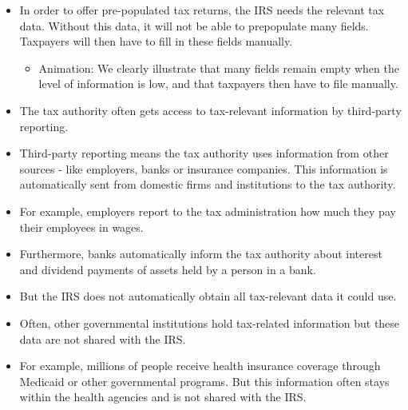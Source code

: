 \documentclass[11pt]{article}
\begin{document}
\begin{itemize}
    \begin{itemize}
        \item Animation: We show what a prepopulated tax return looks like and clearly visualise that many/most fields are already prepopulated, thus reducing the taxpayer's filing burden. 
    \end{itemize}
    \item In order to offer pre-populated tax returns, the IRS needs the relevant tax data. Without this data, it will not be able to prepopulate many fields. Taxpayers will then have to fill in these fields manually.
    \begin{itemize}
        \item Animation: We clearly illustrate that many fields remain empty when the level of information is low, and that taxpayers then have to file manually.
    \end{itemize}
    \item The tax authority often gets access to tax-relevant information by third-party reporting. 
    \item Third-party reporting means the tax authority uses information from other sources - like employers, banks or insurance companies. This information is automatically sent from domestic firms and institutions to the tax authority.
    \item For example, employers report to the tax administration how much they pay their employees in wages.
    \item Furthermore, banks automatically inform the tax authority about interest and dividend payments of assets held by a person in a bank.
    \item But the IRS does not automatically obtain all tax-relevant data it could use. 
    \item Often, other governmental institutions hold tax-related information but these data are not shared with the IRS.
    \item For example, millions of people receive health insurance coverage through Medicaid or other governmental programs. But this information often stays within the health agencies and is not shared with the IRS. %

\end{itemize}
\end{document}
